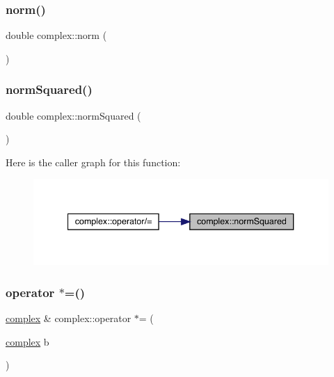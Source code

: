 \subsubsection{\texorpdfstring{norm()}{norm()}}
{\footnotesize\ttfamily double complex\+::norm (\begin{DoxyParamCaption}{ }\end{DoxyParamCaption})}

\mbox{\label{classcomplex_a5f69e50235222338ccd0e985de6b80d1}} 
\subsubsection{\texorpdfstring{normSquared()}{normSquared()}}
{\footnotesize\ttfamily double complex\+::norm\+Squared (\begin{DoxyParamCaption}{ }\end{DoxyParamCaption})}

Here is the caller graph for this function\+:\nopagebreak
\begin{figure}[H]
\begin{center}
\leavevmode
\includegraphics[width=340pt]{classcomplex_a5f69e50235222338ccd0e985de6b80d1_icgraph}
\end{center}
\end{figure}
\mbox{\label{classcomplex_a1916e5817cf8faf91347120309e99e59}} 
\subsubsection{\texorpdfstring{operator $\ast$=()}{operator *=()}\hspace{0.1cm}{\footnotesize\ttfamily [1/2]}}
{\footnotesize\ttfamily \mbox{\hyperlink{classcomplex}{complex}} \& complex\+::operator $\ast$= (\begin{DoxyParamCaption}\item[{\mbox{\hyperlink{classcomplex}{complex}}}]{b }\end{DoxyParamCaption})}

